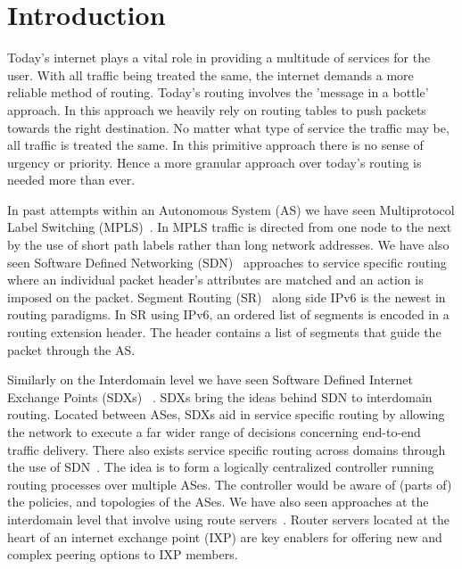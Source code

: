 

\section{Introduction}
\label{sec:introduction}


Today's internet plays a vital role in providing a multitude of services for the user. With all traffic
being treated the same, the internet demands a more reliable method of routing. Today's routing
involves the 'message in a bottle' approach. In this approach we heavily rely on routing tables to 
push packets towards the right destination. No matter what type of service the traffic may be, all 
traffic is treated the same. In this primitive approach there is no sense of urgency or priority. 
Hence a more granular approach over today's routing is needed more than ever. 
 
In past attempts within an Autonomous System (AS) we have seen Multiprotocol Label Switching
(MPLS)~\cite{MPLSSDN}. In MPLS traffic is directed from one node to the next by the use of short
path labels rather than long network addresses. We have also seen Software Defined Networking
(SDN)~\cite{SDNNFV} approaches to service specific routing where an individual packet header's
attributes are matched and an action is imposed on the packet. Segment Routing (SR)~\cite{SRR}
along side IPv6 is the newest in routing paradigms. In SR using IPv6, an ordered list of segments is encoded
in a routing extension header. The header contains a list of segments that guide the packet through
the AS. 

Similarly on the Interdomain level we have seen Software Defined Internet Exchange Points (SDXs) ~\cite{SDX1, SDX2}.
SDXs bring the ideas behind SDN to interdomain routing. Located between
ASes, SDXs aid in service specific routing by allowing the network to execute a far wider range of 
decisions concerning end-to-end traffic delivery. There also exists service specific routing across 
domains through the use of SDN~\cite{InterDSDN}. The idea is to form a logically centralized 
controller running routing processes over multiple ASes. The controller would be aware of (parts of)
the policies, and topologies of the ASes. We have also seen approaches at the interdomain level 
that involve using route servers~\cite{RouteServers}. Router servers located at the heart of an
internet exchange point (IXP) are key enablers for offering new and complex peering options to
IXP members.
 
